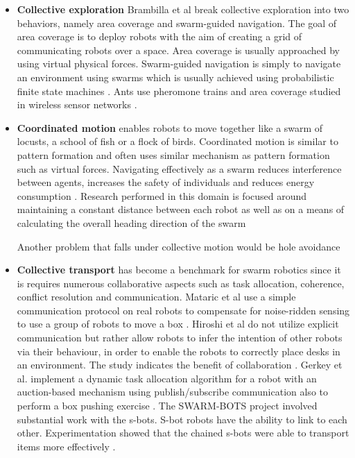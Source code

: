 \begin{itemize}
\item \textbf{Collective exploration}
Brambilla et al \cite{brambilla2013swarm} break collective exploration into two behaviors, namely area coverage and swarm-guided navigation. The goal of area coverage is to deploy robots with the aim of creating a grid of communicating robots over a space. Area coverage is usually approached by using virtual physical forces\cite{howard2002mobile,stirling2010energy}.
Swarm-guided navigation is simply to navigate an environment using swarms which is usually achieved using probabilistic finite state machines \cite{payton2001pheromone,ducatelle2011self}. Ants use pheromone trains and area coverage studied in wireless sensor networks \cite{brambilla2013swarm}. 
	
\item \textbf{Coordinated motion} 
enables robots to move together like a swarm of locusts, a school of fish or a flock of birds. Coordinated motion is similar to pattern formation and often uses similar mechanism as pattern formation such as virtual forces. Navigating effectively as a swarm reduces interference between agents, increases the safety of individuals and reduces energy consumption \cite{parrish2002self}. Research performed in this domain is focused around maintaining a constant distance between each robot as well as on a means of calculating the overall heading direction of the swarm \cite{turgut2008self,ferrante2010flocking,baldassarre2003evolving} 
	
Another problem that falls under collective motion would be hole avoidance \cite{trianni2006cooperative,trianni2005emergent} 

\item \textbf{Collective transport} has become a benchmark for swarm robotics since it is requires numerous collaborative aspects such as task allocation, coherence, conflict resolution and communication. Mataric et al use a simple communication protocol on real robots to compensate for noise-ridden sensing to use a group of robots to move a box \cite{mataric1995cooperative}. Hiroshi et al do not utilize explicit communication but rather allow robots to infer the intention of other robots via their behaviour, in order to enable the robots to correctly place desks in an environment. The study indicates the benefit of collaboration \cite{sugie1995placing}. Gerkey et al. implement a dynamic task allocation algorithm for a robot with an auction-based mechanism using publish/subscribe communication also to perform a box pushing exercise \cite{gerkey2002sold}. The SWARM-BOTS project involved substantial work with the s-bots. S-bot robots have the ability to link to each other. Experimentation showed that the chained s-bots were able to transport items more effectively \cite{gross2004group, dorigo2005swarm, ferrante2013socially}.

\end{itemize}
		
